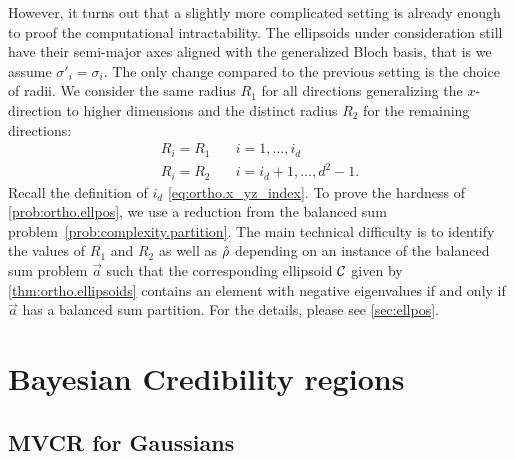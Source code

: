 However, it turns out that a slightly more complicated setting is already enough to proof the computational intractability.
The ellipsoids under consideration still have their semi-major axes aligned with the generalized Bloch basis, that is we assume $\sigma'_i = \sigma_i$.
The only change compared to the previous setting is the choice of radii.
We consider the same radius $R_{1}$ for all directions generalizing the $x$-direction to higher dimensions and the distinct radius $R_{2}$ for the remaining directions:
\[
  \label{eq:ortho.subclass}
  \begin{split}
    R_{i}=R_{1} &\quad i=1,\ldots,i_{d}\\
    R_{i}=R_{2} &\quad i=i_{d}+1,\ldots,d^{2}-1.
  \end{split}
\]
Recall the definition of $i_d$ \cref{eq:ortho.x_yz_index}.
To prove the hardness of \cref{prob:ortho.ellpos}, we use a reduction from the balanced sum problem~\ref{prob:complexity.partition}.
The main technical difficulty is to identify the values of $R_1$ and $R_2$ as well as $\hat{\rho}$ depending on an instance of the balanced sum problem $\vec a$ such that the corresponding ellipsoid $\mathcal{C}$ given by \cref{thm:ortho.ellipsoids} contains an element with negative eigenvalues if and only if $\vec a$ has a balanced sum partition.
For the details, please see \cref{sec:ellpos}.















\section{Bayesian Credibility regions}
\label{sec:bayesian}


\subsection{MVCR for Gaussians}
\label{sub:bayesian.gaussian}

